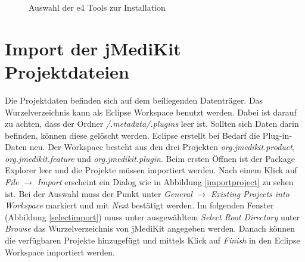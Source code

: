 \begin{figure}[H]
  \vspace{0.5cm}
  \centering
  \caption{Auswahl der e4 Tools zur Installation}
  \label{e4install}
  \vspace{0.5cm}
\end{figure}

\section{Import der jMediKit Projektdateien}

Die Projektdaten befinden sich auf dem beiliegenden Datenträger. Das Wurzelverzeichnis kann als Eclipse Workspace benutzt werden. Dabei ist darauf zu achten, dass der Ordner \textit{/.metadata/.plugins} leer ist. Sollten sich Daten darin befinden, können diese gelöscht werden. Eclipse erstellt bei Bedarf die Plug-in-Daten neu. Der Workspace besteht aus den drei Projekten \textit{org.jmedikit.product}, \textit{org.jmedikit.feature} und \textit{org.jmedikit.plugin}. Beim ersten Öffnen ist der Package Explorer leer und die Projekte müssen importiert werden. Nach einem Klick auf \textit{File} $\rightarrow$ \textit{Import} erscheint ein Dialog wie in Abbildung \ref{importproject} zu sehen ist. Bei der Auswahl muss der Punkt unter \textit{General} $\rightarrow$ \textit{Existing Projects into Workspace} markiert und mit \textit{Next} bestätigt werden. Im folgenden Fenster (Abbildung \ref{selectimport}) muss unter ausgewähltem \textit{Select Root Directory} unter \textit{Browse} das Wurzelverzeichnis von jMediKit angegeben werden. Danach können die verfügbaren Projekte hinzugefügt und mittels Klick auf \textit{Finish} in den Eclipse Workspace importiert werden.

